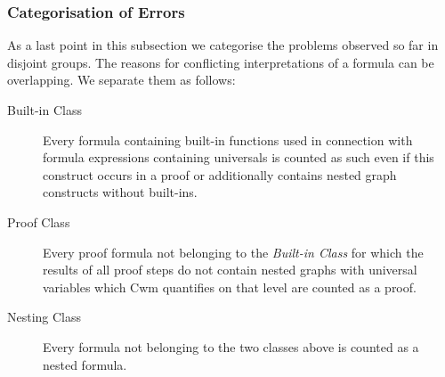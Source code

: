 \subsubsection*{Categorisation of Errors}
As a last point in this subsection we categorise the problems observed so far in disjoint groups. 
The reasons for conflicting interpretations of a formula 
can be overlapping. 
% 
%
We separate them as follows: 
\begin{description}
\item[Built-in Class] Every formula containing built-in functions used in connection with formula 
expressions containing universals
is counted as such even if this construct occurs in a proof or additionally contains nested graph constructs without built-ins.
\item[Proof Class]
Every proof formula not belonging to the \emph{Built-in Class}
for which the results of all proof steps 
do not contain nested graphs with universal variables which Cwm quantifies on that level are counted as a proof.
\item[Nesting Class]
Every formula not belonging to the two classes above is counted as a nested formula.
\end{description}


